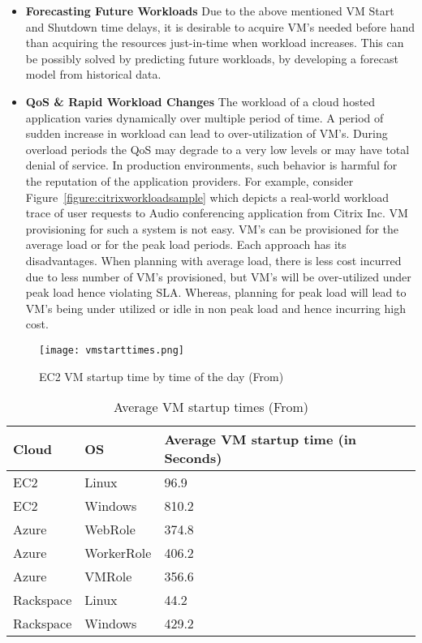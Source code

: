 \begin{itemize}
  \item \textbf{Forecasting Future Workloads} Due to the above mentioned VM Start and Shutdown time delays, it is desirable to acquire VM's needed before hand than acquiring the resources just-in-time when workload increases\cite{roy2011efficient}. This can be possibly solved by predicting future workloads, by developing a forecast model from historical data\cite{roy2011efficient}.
  \item \textbf{QoS \& Rapid Workload Changes} The workload of a cloud hosted application varies dynamically over multiple period of time. A period of sudden increase in workload can lead to over-utilization of VM's. During overload periods the QoS may degrade to a very low levels or may have total denial of service. In production environments, such behavior is harmful for the reputation of the application providers. For example, consider Figure~\ref{figure:citrixworkloadsample} which depicts a real-world workload trace of user requests to Audio conferencing application from Citrix Inc. VM provisioning for such a system is not easy. VM's can be provisioned for the average load or for the peak load periods. Each approach has its disadvantages. When planning with average load, there is less cost incurred due to less number of VM's provisioned, but VM's will be over-utilized under peak load hence violating SLA. Whereas, planning for peak load will lead to VM's being under utilized or idle in non peak load and hence incurring high cost.
\end{itemize}

\begin{figure}[h]
  \begin{center}
    \texttt{[image: vmstarttimes.png]}
    \caption{EC2 VM startup time by time of the day (From\cite{mao2012performance})}
    \label{figure:vmstartuptimes}
  \end{center}
\end{figure}

\begin{flushleft}
  \begin{table}
    \begin{tabular}{ | l | l | l |}
      \hline
      Cloud & OS & Average VM startup time (in Seconds) \\ \hline
      EC2 & Linux & 96.9 \\ \hline
      EC2 & Windows & 810.2 \\ \hline
      Azure & WebRole & 374.8 \\ \hline
      Azure & WorkerRole & 406.2 \\ \hline
      Azure & VMRole & 356.6 \\ \hline
      Rackspace & Linux & 44.2 \\ \hline
      Rackspace & Windows & 429.2 \\ \hline
    \end{tabular}
    \caption{Average VM startup times (From\cite{mao2012performance})}
     \label{table:avgvmtime}
\end{table}
\end{flushleft}

